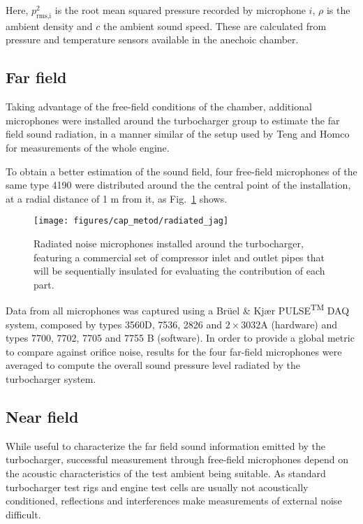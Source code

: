 Here, $p^2_\text{rms,i}$ is the root mean squared pressure recorded by microphone $i$, $\rho$ is the ambient density and $c$ the ambient sound speed. These are calculated from pressure and temperature sensors available in the anechoic chamber.

\subsection{Far field}
\label{sub:metod_far_field}

Taking advantage of the free-field conditions of the chamber, additional microphones were installed around the turbocharger group to estimate the far field sound radiation, in a manner similar of the setup used by Teng and Homco for measurements of the whole \cite{teng2009investigation} engine.

To obtain a better estimation of the sound field, four free-field microphones of the same type 4190 were distributed around the the central point of the installation, at a radial distance of 1 m from it, as Fig.~\ref{fig:radiated_jag} shows.

\begin{figure}[b!]
\centering
\texttt{[image: figures/cap\_metod/radiated\_jag]}
\caption[Radiated noise microphones installed around the turbocharger]{Radiated noise microphones installed around the turbocharger, featuring a commercial set of compressor inlet and outlet pipes that will be sequentially insulated for evaluating the contribution of each part.}
\label{fig:radiated_jag}
\end{figure}

Data from all microphones was captured using a Brüel \& Kjær PULSE\textsuperscript{TM} DAQ system, composed by types 3560D, 7536, 2826 and $2\times 3032$A (hardware) and types 7700, 7702, 7705 and 7755 B (software). In order to provide a global metric to compare against orifice noise, results for the four far-field microphones were averaged to compute the overall sound pressure level radiated by the turbocharger system.

\subsection{Near field} %

While useful to characterize the far field sound information emitted by the turbocharger, successful measurement through free-field microphones depend on the acoustic characteristics of the test ambient being suitable. As standard turbocharger test rigs and engine test cells are usually not acoustically conditioned, reflections and interferences make measurements of external noise difficult. 

